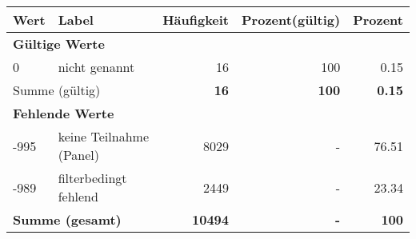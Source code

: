      \begin{longtable}{lXrrr}
     \toprule
     \textbf{Wert} & \textbf{Label} & \textbf{Häufigkeit} & \textbf{Prozent(gültig)} & \textbf{Prozent} \\
     \endhead
     \midrule
     \multicolumn{5}{l}{\textbf{Gültige Werte}}\\

     0 &
     \multicolumn{1}{X}{ nicht genannt   } &


       \num{16} &
       \num[round-mode=places,round-precision=2]{100} &
         \num[round-mode=places,round-precision=2]{0.15} \\
     \midrule
     \multicolumn{2}{l}{Summe (gültig)} &
       \textbf{\num{16}} &
     \textbf{\num{100}} &
       \textbf{\num[round-mode=places,round-precision=2]{0.15}} \\
     \multicolumn{5}{l}{\textbf{Fehlende Werte}}\\
       -995 &
       keine Teilnahme (Panel) &
         \num{8029} &
        - &
         \num[round-mode=places,round-precision=2]{76.51} \\
       -989 &
       filterbedingt fehlend &
         \num{2449} &
        - &
         \num[round-mode=places,round-precision=2]{23.34} \\
     \midrule
     \multicolumn{2}{l}{\textbf{Summe (gesamt)}} &
          \textbf{\num{10494}} &
        \textbf{-} &
        \textbf{\num{100}} \\
     \bottomrule
     \end{longtable}
     
